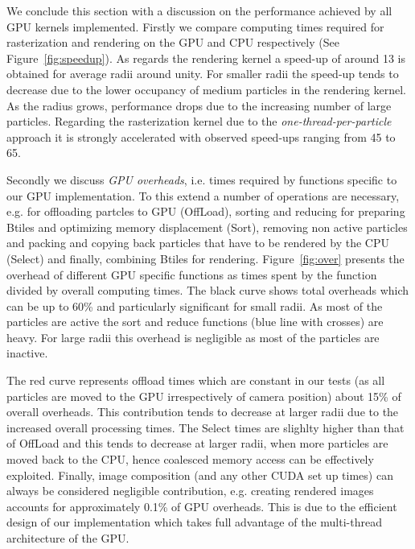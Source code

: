 \documentclass[1p]{elsarticle}
\begin{document}
We conclude this section with a discussion on the performance achieved by all GPU kernels implemented. Firstly we compare computing times required for rasterization and rendering on the GPU and CPU respectively (See Figure~\ref{fig:speedup}). As regards the rendering kernel a speed-up of around 13 is obtained for
average radii around unity. For smaller radii the speed-up tends to decrease due to the lower occupancy of medium particles in the rendering kernel.
As the radius grows, performance drops due to the increasing number of large particles.
Regarding the rasterization kernel due to the {\it one-thread-per-particle} approach it is strongly
accelerated with observed speed-ups ranging from 45 to 65. 

Secondly we discuss {\it GPU overheads}, i.e. times required by functions specific to our GPU implementation. To this extend a number of operations are necessary, e.g. for offloading partcles to GPU (OffLoad), sorting and reducing for preparing Btiles and optimizing memory displacement (Sort), removing non active particles and packing and copying back particles that have to be rendered by the CPU (Select) and finally, combining Btiles for rendering. Figure~\ref{fig:over} presents the overhead of different GPU specific functions as times spent by the function divided by overall computing times. The black curve shows total overheads which can be up to 60\% and particularly significant for small radii. As most of the particles are active the sort and reduce 
functions (blue line with crosses) are heavy. For large radii this overhead is negligible as most of the particles are inactive. 

The red curve represents offload times which are constant in our tests (as all particles are moved to the GPU irrespectively of camera position) about 15\% of overall overheads. This contribution tends to decrease at larger radii due to the increased overall processing times. The Select times are slighlty higher than that of OffLoad and this tends to decrease at larger radii, when more particles are moved back to the CPU, hence coalesced memory access can be effectively exploited. Finally, image composition (and any other CUDA set up times) can always be considered negligible contribution, e.g. creating rendered images accounts for approximately 0.1\% of GPU overheads. This is due to the efficient design of our 
implementation which takes full advantage of the multi-thread architecture 
of the GPU.
\end{document}
